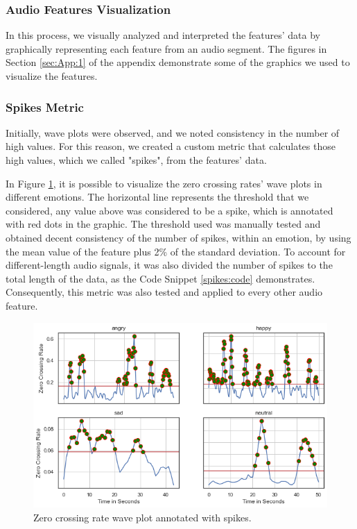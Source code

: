\subsubsection{Audio Features Visualization}

In this process, we visually analyzed and interpreted the features' data by graphically representing each feature from an audio segment. The figures in Section \ref{sec:App:1} of the appendix demonstrate some of the graphics we used to visualize the features.

\subsubsection{Spikes Metric}
\label{spikes:metric}

Initially, wave plots were observed, and we noted consistency in the number of high values. For this reason, we created a custom metric that calculates those high values, which we called "spikes", from the features' data.

In Figure \ref{fig:zcrSpikes}, it is possible to visualize the zero crossing rates' wave plots in different emotions. The horizontal line represents the threshold that we considered, any value above was considered to be a spike, which is annotated with red dots in the graphic. The threshold used was manually tested and obtained decent consistency of the number of spikes, within an emotion, by using the mean value of the feature plus 2\% of the standard deviation. To account for different-length audio signals, it was also divided the number of spikes to the total length of the data, as the Code Snippet \ref{spikes:code} demonstrates. Consequently, this metric was also tested and applied to every other audio feature.

\begin{figure}[H]
	\centering
	\includegraphics[width=.7\textwidth]{figs/4_1_traditional/zcr_waveplot_spikes.png}
	\caption{Zero crossing rate wave plot annotated with spikes.}
	\label{fig:zcrSpikes}
\end{figure}

